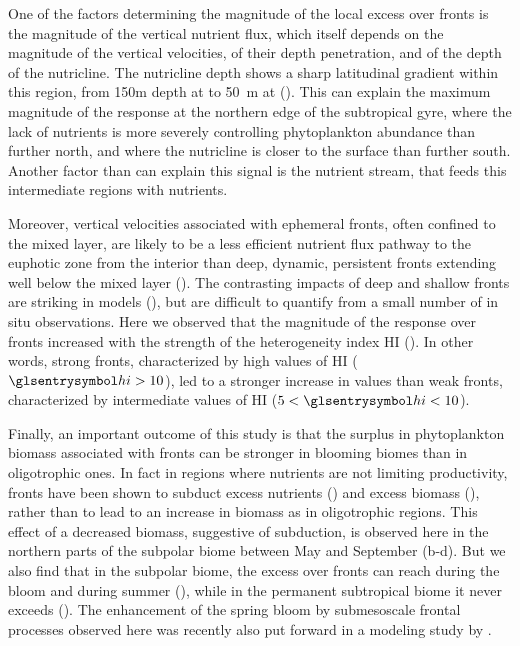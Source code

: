 One of the factors determining the magnitude of the local  excess over fronts is the magnitude of the vertical nutrient flux, which itself depends on the magnitude of the vertical velocities, of their depth penetration, and of the depth of the nutricline.
The nutricline depth shows a sharp latitudinal gradient within this region, from 150m depth at  to \qty{50}{\m} at  (\cite{romera-castillo_2016}).
This can explain the maximum magnitude of the  response at the northern edge of the subtropical gyre, where the lack of nutrients is more severely controlling phytoplankton abundance than further north, and where the nutricline is closer to the surface than further south. Another factor than can explain this signal is the nutrient stream, that feeds this intermediate regions with nutrients.

Moreover, vertical velocities associated with ephemeral fronts, often confined to the mixed layer, are likely to be a less efficient nutrient flux pathway to the euphotic zone from the interior than deep, dynamic, persistent fronts extending well below the mixed layer (\cite{levy_2018}).
The contrasting impacts of deep and shallow fronts are striking in models (\cite{levy_2012}), but are difficult to quantify from a small number of in situ observations.
Here we observed that the magnitude of the  response over fronts increased with the strength of the heterogeneity index HI ().
In other words, strong fronts, characterized by high values of HI (\(\am{hi} > 10\)), led to a stronger increase in  values than weak fronts, characterized by intermediate values of HI (\(5 < \am{hi} < 10\)).

Finally, an important outcome of this study is that the surplus in phytoplankton biomass associated with fronts can be stronger in blooming biomes than in oligotrophic ones.
In fact in regions where nutrients are not limiting productivity, fronts have been shown to subduct excess nutrients (\cite{oschlies_2002, gruber_2011}) and excess biomass (\cite{lathuiliere_2010}), rather than to lead to an increase in biomass as in oligotrophic regions.
This effect of a decreased biomass, suggestive of subduction, is observed here in the northern parts of the subpolar biome between May and September (b-d).
But we also find that in the subpolar biome, the  excess over fronts can reach  during the bloom and  during summer (), while in the permanent subtropical biome it never exceeds  ().
The enhancement of the spring bloom by submesoscale frontal processes observed here was recently also put forward in a modeling study by \textcite{simoes-sousa_2022}.

